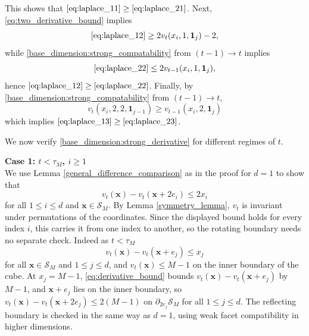 \documentclass[12pt]{amsart}
\begin{document}
	This shows that $\eqref{eq:laplace_11} \geq \eqref{eq:laplace_21}$.
  	Next, \eqref{eq:two_derivative_bound} implies 
  \[
  \eqref{eq:laplace_12} \geq 2 v_t(x_i, 1, \mathbf{1}_j) - 2,
  \]
  while \eqref{base_dimension:strong_compatability} from $(t-1) \to t$ 
  implies 
    \[
  \eqref{eq:laplace_22} \leq 2 v_{t-1}(x_i, 1, \mathbf{1}_j),
  \]
  hence $\eqref{eq:laplace_12} \geq \eqref{eq:laplace_22}$.
  Finally, by \eqref{base_dimension:strong_compatability} from $(t-1) \to t$, 
  \[
  v_t(x_i,2,2,\mathbf{1}_{j-1}) \geq v_{t-1}(x_i,2,\mathbf{1}_j)
  \]
  which implies $\eqref{eq:laplace_13} \geq \eqref{eq:laplace_23}$.
  


	We now verify \eqref{base_dimension:strong_derivative} for different
	regimes of $t$. 





{\bf Case 1: $t < \tau_M$, $i \geq 1$} \\
We use Lemma \ref{general_difference_comparison} as in the proof for $d=1$
to show that
\[
v_t(\mathbf{x}) - v_t(\mathbf{x} + 2 e_i) \leq 2 x_i
\]
for all $1 \leq i \leq d$ and $\mathbf{x} \in \mathcal{S}_M$.  By Lemma \ref{symmetry_lemma}, $v_t$ is invariant under permutations of the coordinates. Since the displayed bound holds for every index $i$, this carries it from one index to another, so the rotating boundary needs no separate check.
Indeed as $t < \tau_M$
\begin{equation} \label{eq:derivative_bound}
v_{t}(\mathbf{x}) - v_{t}(\mathbf{x} + e_j) \leq x_j
\end{equation}
for all $\mathbf{x} \in \mathcal{S}_M$ and $1 \leq j \leq d$, and $v_t(\mathbf{x}) \leq M-1$ on the inner boundary of the cube.
At $x_j = M-1$, \eqref{eq:derivative_bound} bounds $v_t(\mathbf{x}) - v_t(\mathbf{x} + e_j)$ by $M-1$, and $\mathbf{x} + e_j$ lies on the inner boundary, so
$v_t(\mathbf{x}) - v_t(\mathbf{x} + 2 e_j) \leq 2 (M-1)$ on $\partial_{2 e_j} \mathcal{S}_M$ for all $1 \leq j \leq d$.
The reflecting boundary is checked in the same way as $d=1$, using weak facet compatibility in higher dimensions.
\end{document}
